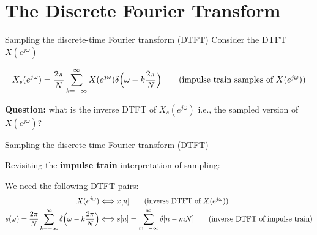 \documentclass[10pt, handout]{beamer}
\begin{document}
\section{The Discrete Fourier Transform}
\begin{frame}{Sampling the discrete-time Fourier transform (DTFT)}
	Consider the DTFT $X(e^{j\omega})$
	\begin{center}
		\resizebox{0.65\textwidth}{!}{}
	\end{center}
	\vspace{-0.25cm}	
	
	\pause	
	\begin{equation*}
		X_s(e^{j\omega}) = \frac{2\pi}{N}\sum_{k=-\infty}^\infty X(e^{j\omega})\delta\Big(\omega-k\frac{2\pi}{N}\Big) \tag{impulse train samples of $X(e^{j\omega})$}
	\end{equation*}
	
	\textbf{Question:} what is the inverse DTFT of $X_s(e^{j\omega})$ i.e., the sampled version of $X(e^{j\omega})$?

\end{frame}

%
\begin{frame}{Sampling the discrete-time Fourier transform (DTFT)}

Revisiting the \textbf{impulse train} interpretation of sampling:
\begin{center}
	\resizebox{\textwidth}{!}{}
\end{center}

We need the following DTFT pairs:
\begin{align*}
X(e^{j\omega}) &\Longleftrightarrow x[n] \tag{inverse DTFT of $X(e^{j\omega})$}\\
s(\omega) = \frac{2\pi}{N}\sum_{k=-\infty}^\infty\delta\Big(\omega-k\frac{2\pi}{N}\Big) &\Longleftrightarrow s[n] = \sum_{m=-\infty}^\infty\delta[n-mN] \tag{inverse DTFT of impulse train}
\end{align*}
\end{frame}
\end{document}
